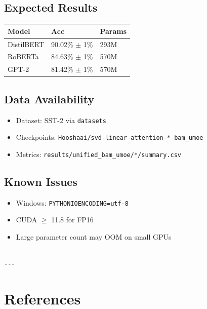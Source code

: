 \subsection{Expected Results}

\begin{table}[H]
\centering
\small
\begin{tabular}{lll}
\toprule
\textbf{Model} & \textbf{Acc} & \textbf{Params} \\
\midrule
DistilBERT & 90.02\% $\pm$ 1\% & 293M \\
RoBERTa & 84.63\% $\pm$ 1\% & 570M \\
GPT-2 & 81.42\% $\pm$ 1\% & 570M \\
\bottomrule
\end{tabular}
\end{table}

\subsection{Data Availability}

\begin{itemize}
\item Dataset: SST-2 via \texttt{datasets}
\item Checkpoints: \texttt{Hooshaai/svd-linear-attention-*-bam\_umoe}
\item Metrics: \texttt{results/unified\_bam\_umoe/*/summary.csv}

\end{itemize}
\subsection{Known Issues}

\begin{itemize}
\item Windows: \texttt{PYTHONIOENCODING=utf-8}
\item CUDA $\ge$ 11.8 for FP16
\item Large parameter count may OOM on small GPUs
\end{itemize}
\begin{lstlisting}

---
\end{lstlisting}

\section{References}

